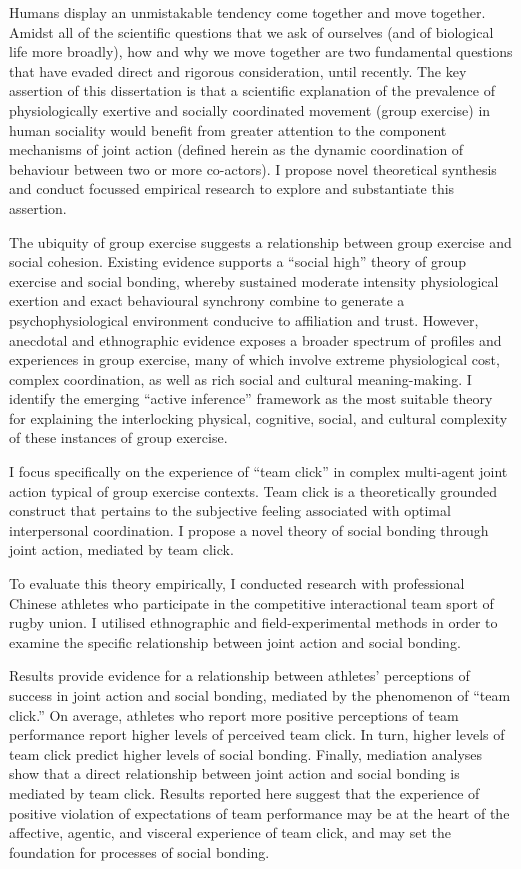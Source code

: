 Humans display an unmistakable tendency come together and move together.  Amidst all of the scientific questions that we ask of ourselves (and of biological life more broadly), how and why we move together are two fundamental questions that have evaded direct and rigorous consideration, until recently.  The key assertion of this dissertation is that a scientific explanation of the prevalence of physiologically exertive and socially coordinated movement (group exercise) in human sociality would benefit from greater attention to the component mechanisms of joint action (defined herein as the dynamic coordination of behaviour between two or more co-actors).  I propose novel theoretical synthesis and conduct focussed empirical research to explore and substantiate this assertion.

The ubiquity of group exercise suggests a relationship between group exercise and social cohesion. Existing evidence supports a ``social high'' theory of group exercise and social bonding, whereby sustained moderate intensity physiological exertion and exact behavioural synchrony combine to generate a psychophysiological environment conducive to affiliation and trust.   However, anecdotal and ethnographic evidence exposes a broader spectrum of profiles and experiences in group exercise, many of which involve extreme physiological cost, complex coordination, as well as rich social and cultural meaning-making.   I identify the emerging ``active inference'' framework \citep{Friston2010} as the most suitable theory for explaining the interlocking physical, cognitive, social, and cultural complexity of these instances of group exercise.

I focus specifically on the experience of ``team click'' in complex multi-agent joint action typical of group exercise contexts.  Team click is a theoretically grounded construct that pertains to the subjective feeling associated with optimal interpersonal coordination.  I propose a novel theory of social bonding through joint action, mediated by team click.

To evaluate this theory empirically, I conducted research with professional Chinese athletes who participate in the competitive interactional team sport of rugby union.  I utilised ethnographic and field-experimental methods in order to examine the specific relationship between joint action and social bonding.

Results provide evidence for a relationship between athletes' perceptions of success in joint action and social bonding, mediated by the phenomenon of ``team click.''  On average, athletes who report more positive perceptions of team performance report higher levels of perceived team click.  In turn, higher levels of team click predict higher levels of social bonding. Finally, mediation analyses show that a direct relationship between joint action and social bonding is mediated by team click. Results reported here suggest that the experience of positive violation of expectations of team performance may be at the heart of the affective, agentic, and visceral experience of team click, and may set the foundation for processes of social bonding.

